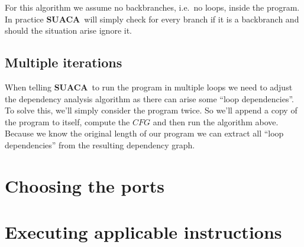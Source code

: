 \documentclass[a4paper,12pt,titlepage, twoside]{report}
\newcommand{\suaca}{\textbf{SUACA}}
\begin{document}
For this algorithm we assume no backbranches, i.e.\ no loops, inside the program. In practice \suaca\ will simply check for every branch if it is a backbranch and should the situation arise ignore it.


\subsection{Multiple iterations}

When telling \suaca\ to run the program in multiple loops we need to adjust the dependency analysis algorithm as there can arise some ``loop dependencies''. To solve this, we'll simply consider the program twice. So we'll append a copy of the program to itself, compute the $CFG$ and then run the algorithm above. Because we know the original length of our program we can extract all ``loop dependencies'' from the resulting dependency graph.

\section{Choosing the ports}

\section{Executing applicable instructions}


{\small }
\end{document}
